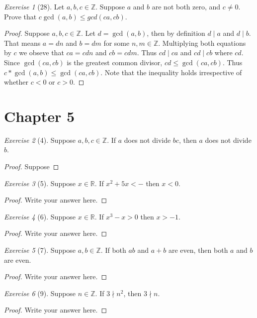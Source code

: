 \documentclass[12pt]{amsart}
\theoremstyle{remark}
\newtheorem*{exercise}{Exercise}%
\def\RR{\ensuremath{\mathbb R}}
\def\ZZ{\ensuremath{\mathbb Z}}
\theoremstyle{mycomment}
\begin{document}
\begin{exercise}[28] Let $a,b,c\in\ZZ$. Suppose $a$ and $b$ are not both  zero, and $c\ne 0$. Prove that $c\gcd(a,b)\le gcd(ca,cb)$.
\begin{proof}
	Suppose $a,b,c \in \ZZ$. Let $d = \gcd(a,b)$, then by definition $d \mid a$ and $d \mid b$. That means $a = dn$ and $b = dm$ for some $n,m \in \ZZ$. Multiplying both equations by $c$ we obseve that $ca = cdn$ and $cb = cdm$. Thus $cd \mid ca$ and $cd \mid cb$ where $cd$. Since $\gcd(ca, cb)$ is the greatest common divisor, $cd \leq \gcd(ca, cb)$. Thus $c*\gcd(a,b) \leq \gcd(ca, cb)$. Note that the inequality holds irrespective of whether $c < 0$ or $c > 0$.  
\end{proof}
\end{exercise}
\section*{Chapter 5}
\begin{exercise}[4] Suppose $a,b,c \in\ZZ$. If $a$ does not divide $bc$, then $a$ does not divide $b$.
\begin{proof}
Suppose
\end{proof}
\end{exercise}

\begin{exercise}[5] Suppose $x\in\RR$. %
If $x^{2}+5x<-$ then $x<0$.
\begin{proof}
Write your answer here.
\end{proof}
\end{exercise}

\begin{exercise}[6] Suppose $x\in\RR$. If $x^{3}-x>0$ then $x>-1$.
\begin{proof}
Write your answer here.
\end{proof}
\end{exercise}

\begin{exercise}[7] Suppose $a,b\in\ZZ$. If both $ab$ and $a+b$ are even, then both $a$ and $b$ are even.
\begin{proof}
Write your answer here.
\end{proof}
\end{exercise}

\begin{exercise}[9] Suppose $n\in\ZZ$. If $3\nmid n^{2}$, then $3\nmid n$. %
\begin{proof}
Write your answer here.
\end{proof}
\end{exercise}
\end{document}
